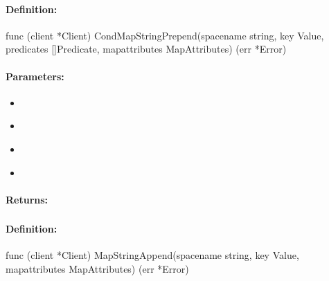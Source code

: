 \paragraph{Definition:}
\begin{gocode}
func (client *Client) CondMapStringPrepend(spacename string, key Value, predicates []Predicate, mapattributes MapAttributes) (err *Error)
\end{gocode}

\paragraph{Parameters:}
\begin{itemize}[noitemsep]
\item {}\\

\item {}\\

\item {}\\

\item {}\\

\end{itemize}

\paragraph{Returns:}


\pagebreak
\subsubsection{}
\label{api:Go:MapStringAppend}


\paragraph{Definition:}
\begin{gocode}
func (client *Client) MapStringAppend(spacename string, key Value, mapattributes MapAttributes) (err *Error)
\end{gocode}

